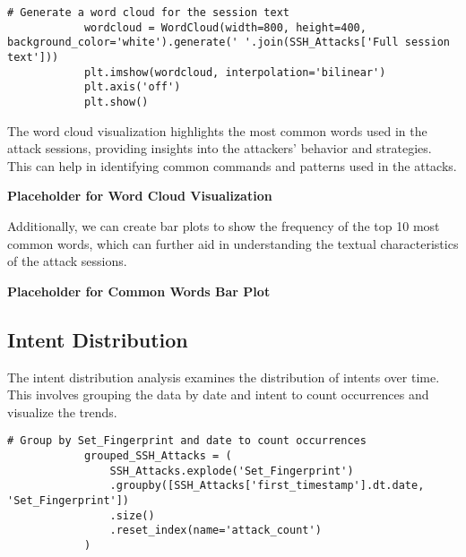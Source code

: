         \vspace{0.5em}

        \begin{lstlisting}[caption={Generate a word cloud from session text}, label={lst:generate-wordcloud}]
            # Generate a word cloud for the session text
            wordcloud = WordCloud(width=800, height=400, background_color='white').generate(' '.join(SSH_Attacks['Full session text']))
            plt.imshow(wordcloud, interpolation='bilinear')
            plt.axis('off')
            plt.show()
        \end{lstlisting}

        The word cloud visualization highlights the most common words used in the attack sessions, providing insights into the attackers' behavior and strategies. This can help in identifying common commands and patterns used in the attacks.

        \textbf{Placeholder for Word Cloud Visualization}

        Additionally, we can create bar plots to show the frequency of the top 10 most common words, which can further aid in understanding the textual characteristics of the attack sessions.

        \textbf{Placeholder for Common Words Bar Plot}

    \subsection{Intent Distribution}
            
        The intent distribution analysis examines the distribution of intents over time. This involves grouping the data by date and intent to count occurrences and visualize the trends.
        
        \vspace{0.5em}

        \begin{lstlisting}[caption={Group attacks by fingerprint and date}, label={lst:group-attacks}]
            # Group by Set_Fingerprint and date to count occurrences
            grouped_SSH_Attacks = (
                SSH_Attacks.explode('Set_Fingerprint')
                .groupby([SSH_Attacks['first_timestamp'].dt.date, 'Set_Fingerprint'])
                .size()
                .reset_index(name='attack_count')
            )
        \end{lstlisting}

